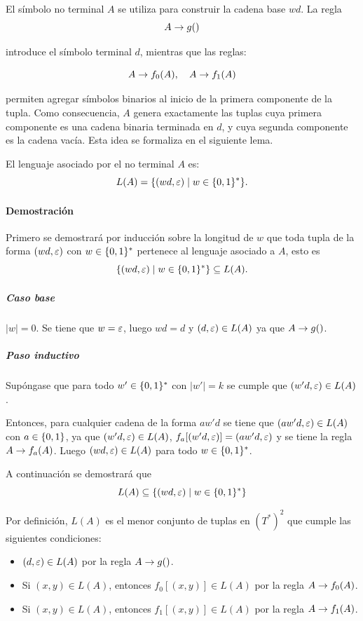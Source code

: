 El símbolo no terminal $A$ se utiliza para construir la cadena base $wd$. La regla
$$
    A \rightarrow g()
$$

introduce el símbolo terminal $d$, mientras que las reglas:

$$
    A \rightarrow f_0(A), \quad A\rightarrow f_1(A)
$$

permiten agregar símbolos binarios al inicio de la primera componente de la tupla. Como consecuencia, $A$ genera exactamente las tuplas cuya primera componente es una cadena binaria terminada en $d$, y cuya segunda componente es la cadena vacía. Esta idea se formaliza en el siguiente lema.

\begin{lemma}
    \label{lemma:la}
    El lenguaje asociado por el no terminal $A$ es:
    $$
        L(A) = \{ (w d, \varepsilon) \;|\; w \in \{0, 1\}^* \}.
    $$
\end{lemma}

\paragraph{Demostración} Primero se demostrará por inducción sobre la longitud de $w$ que toda tupla de la forma $(w d, \varepsilon)$ con $w \in \{0, 1\}^*$ pertenece al lenguaje asociado a $A$, esto es
$$
    \{ (w d, \varepsilon) \;|\; w \in \{0, 1\}^* \} \subseteq L(A).
$$

\subparagraph{Caso base} $|w| = 0$. Se tiene que $w = \varepsilon$, luego $w d = d$ y $(d, \varepsilon) \in L(A)$ ya que $A \rightarrow g()$.

\subparagraph{Paso inductivo} Supóngase que para todo $w' \in \{0, 1\}^*$ con $|w'| = k$ se cumple que $(w' d, \varepsilon) \in L(A)$.

Entonces, para cualquier cadena de la forma $aw'd$ se tiene que $(a w' d, \varepsilon) \in L(A)$  con $a \in \{0, 1\}$, ya que $(w' d, \varepsilon) \in L(A)$, $f_a[(w' d, \varepsilon)] = (aw'd, \varepsilon) $ y se tiene la regla $A \rightarrow f_a(A)$. Luego $(w d, \varepsilon) \in L(A)$ para todo $w \in \{0, 1\}^*$.

A continuación se demostrará que
$$
    L(A) \subseteq \{ (w d, \varepsilon) \;|\; w \in \{0, 1\}^* \}
$$

Por definición, $L(A)$ es el menor conjunto de tuplas en $(T^*)^2$ que cumple las siguientes condiciones:
\begin{itemize}
    \item $(d, \varepsilon) \in L(A)$ por la regla $A \rightarrow g()$.
    \item Si $(x, y) \in L(A)$, entonces $f_0[(x, y)] \in L(A)$ por la regla $A \rightarrow f_0(A)$.
    \item Si $(x, y) \in L(A)$, entonces $f_1[(x, y)] \in L(A)$ por la regla $A \rightarrow f_1(A)$.
\end{itemize}

